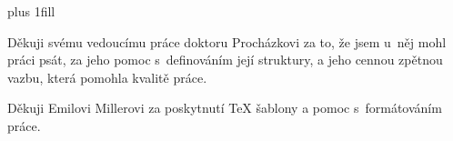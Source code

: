 \vglue 0pt plus 1fill

Děkuji svému vedoucímu práce doktoru Procházkovi za to, že jsem u~něj mohl práci psát, za jeho pomoc s~definováním její struktury, a jeho cennou zpětnou vazbu, která pomohla kvalitě práce.

Děkuji Emilovi Millerovi za poskytnutí TeX šablony a pomoc s~formátováním práce.



\vspace{20mm}
\newpage

